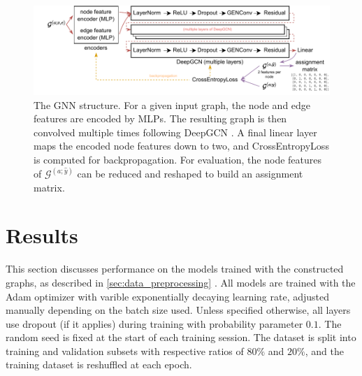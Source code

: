 \documentclass[10pt,conference,compsocconf,a4paper]{IEEEtran}
\newcommand{\G}{\mathcal{G}}
\newcommand*{\shortautoref}[1]{%
	\begingroup
	\def\equationautorefname{\textsc{Eq.}}%
	\def\tableautorefname{\textsc{Tab.}}%
	\def\figureautorefname{\textsc{Fig.}}%
	\autoref{#1}%
	\endgroup
}
\begin{document}


		\begin{figure}
			\centering
			\includegraphics[width=\linewidth]{figures/nn.v2.pdf}
			\caption{The GNN structure. For a given input graph, the node and edge features are encoded by MLPs. The resulting graph is then convolved multiple times following DeepGCN \cite{li_deepergcn_2020}. A final linear layer maps the encoded node features down to two, and CrossEntropyLoss is computed for backpropagation. For evaluation, the node features of $\G^{(a;\hat y)}$ can be reduced and reshaped to build an assignment matrix.}
			\label{fig:nn}
		\end{figure}


\section{Results}

	This section discusses performance on the models trained with the constructed graphs, as described in \shortautoref{sec:data_preprocessing}. All models are trained with the Adam optimizer with varible exponentially decaying learning rate, adjusted manually depending on the batch size used. Unless specified otherwise, all layers use dropout (if it applies) during training with probability parameter $0.1$. The random seed is fixed at the start of each training session. The dataset is split into training and validation subsets with respective ratios of $80\%$ and $20\%$, and the training dataset is reshuffled at each epoch.
\end{document}
